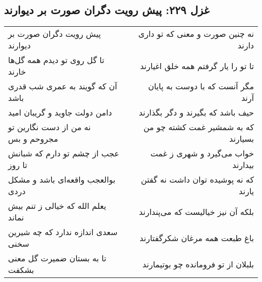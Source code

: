 \begin{center}
\section*{غزل ۲۲۹: پیش رویت دگران صورت بر دیوارند}
\label{sec:229}
\begin{longtable}{l p{0.5cm} r}
پیش رویت دگران صورت بر دیوارند
&&
نه چنین صورت و معنی که تو داری دارند
\\
تا گل روی تو دیدم همه گل‌ها خارند
&&
تا تو را یار گرفتم همه خلق اغیارند
\\
آن که گویند به عمری شب قدری باشد
&&
مگر آنست که با دوست به پایان آرند
\\
دامن دولت جاوید و گریبان امید
&&
حیف باشد که بگیرند و دگر بگذارند
\\
نه من از دست نگارین تو مجروحم و بس
&&
که به شمشیر غمت کشته چو من بسیارند
\\
عجب از چشم تو دارم که شبانش تا روز
&&
خواب می‌گیرد و شهری ز غمت بیدارند
\\
بوالعجب واقعه‌ای باشد و مشکل دردی
&&
که نه پوشیده توان داشت نه گفتن یارند
\\
یعلم الله که خیالی ز تنم بیش نماند
&&
بلکه آن نیز خیالیست که می‌پندارند
\\
سعدی اندازه ندارد که چه شیرین سخنی
&&
باغ طبعت همه مرغان شکرگفتارند
\\
تا به بستان ضمیرت گل معنی بشکفت
&&
بلبلان از تو فرومانده چو بوتیمارند
\\
\end{longtable}
\end{center}
